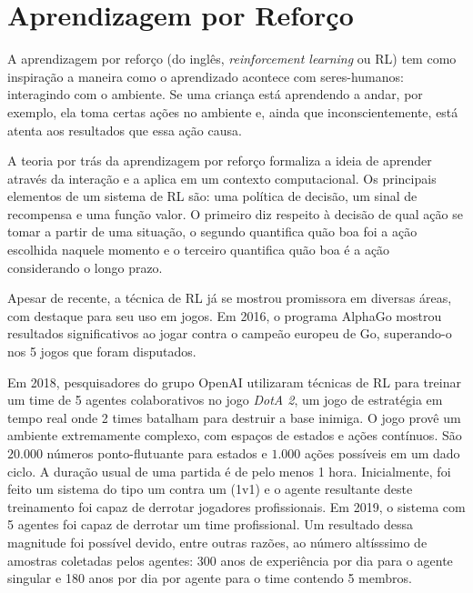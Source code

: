 \section{Aprendizagem por Reforço}
\par A aprendizagem por reforço (do inglês, \textit{reinforcement learning} ou RL) tem como inspiração a maneira como o aprendizado acontece com seres-humanos: interagindo com o ambiente. \cite{sutton2018reinforcement} Se uma criança está aprendendo a andar, por exemplo, ela toma certas ações no ambiente e, ainda que inconscientemente, está atenta aos resultados que essa ação causa. 
\par A teoria por trás da aprendizagem por reforço formaliza a ideia de aprender através da interação e a aplica em um contexto computacional. Os principais elementos de um sistema de RL são: uma política de decisão, um sinal de recompensa e uma função valor.  O primeiro diz respeito à decisão de qual ação se tomar a partir de uma situação, o segundo quantifica quão boa foi a ação escolhida naquele momento e o terceiro quantifica quão boa é a ação considerando o longo prazo.\cite{sutton2018reinforcement}
\par Apesar de recente, a técnica de RL já se mostrou promissora em diversas áreas, com destaque para seu uso em jogos. Em 2016, o programa AlphaGo mostrou resultados significativos ao jogar contra o campeão europeu de Go, superando-o nos 5 jogos que foram disputados. \cite{SilverHuangEtAl16nature}

Em 2018, pesquisadores do grupo OpenAI utilizaram técnicas de RL para treinar um time de 5 agentes colaborativos no jogo \textit{DotA 2}, um jogo de estratégia em tempo real onde 2 times batalham para destruir a base inimiga. O jogo provê um ambiente extremamente complexo, com espaços de estados e ações contínuos. São $20.000$ números ponto-flutuante para estados e $1.000$ ações possíveis em um dado ciclo.
A duração usual de uma partida é de pelo menos 1 hora. Inicialmente, foi feito um sistema do tipo um contra um (1v1) e o agente resultante deste treinamento foi capaz de derrotar jogadores profissionais. Em 2019, o sistema com 5 agentes foi capaz de derrotar um time profissional. \cite{OpenAI_dota} Um resultado dessa magnitude foi possível devido, entre outras razões, ao número altísssimo de amostras coletadas pelos agentes: 300 anos de experiência por dia para o agente singular e 180 anos por dia por agente para o time contendo 5 membros.

